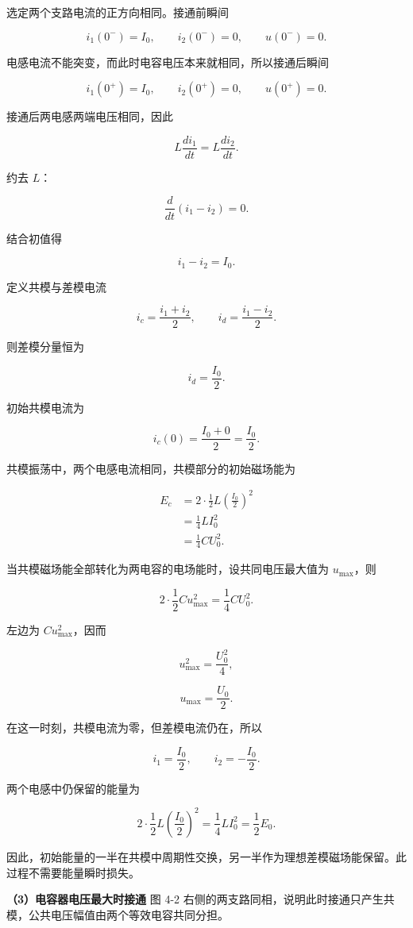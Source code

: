\documentclass[12pt,a4paper,UTF8]{ctexart}
\begin{document}
选定两个支路电流的正方向相同。接通前瞬间

\[i_1(0^-)=I_0,\qquad i_2(0^-)=0,\qquad u(0^-)=0.\]

电感电流不能突变，而此时电容电压本来就相同，所以接通后瞬间

\[i_1(0^+)=I_0,\qquad i_2(0^+)=0,\qquad u(0^+)=0.\]

接通后两电感两端电压相同，因此

\[L\frac{di_1}{dt}=L\frac{di_2}{dt}.\]

约去 \(L\)：

\[\frac d{dt}(i_1-i_2)=0.\]

结合初值得

\[\boxed{i_1-i_2=I_0}.\]

定义共模与差模电流

\[i_c=\frac{i_1+i_2}{2},\qquad
i_d=\frac{i_1-i_2}{2}.\]

则差模分量恒为

\[i_d=\frac{I_0}{2}.\]

初始共模电流为

\[i_c(0)=\frac{I_0+0}{2}=\frac{I_0}{2}.\]

共模振荡中，两个电感电流相同，共模部分的初始磁场能为

\[\begin{aligned}
E_c
&=2\cdot\frac12L\left(\frac{I_0}{2}\right)^2\\
&=\frac14LI_0^2\\
&=\frac14CU_0^2.
\end{aligned}\]

当共模磁场能全部转化为两电容的电场能时，设共同电压最大值为
\(u_{\max}\)，则

\[2\cdot\frac12C u_{\max}^2=\frac14CU_0^2.\]

左边为 \(Cu_{\max}^2\)，因而

\[u_{\max}^2=\frac{U_0^2}{4},\]

\[\boxed{u_{\max}=\frac{U_0}{2}}.\]

在这一时刻，共模电流为零，但差模电流仍在，所以

\[i_1=\frac{I_0}{2},\qquad i_2=-\frac{I_0}{2}.\]

两个电感中仍保留的能量为

\[2\cdot\frac12L\left(\frac{I_0}{2}\right)^2
=\frac14LI_0^2
=\frac12E_0.\]

因此，初始能量的一半在共模中周期性交换，另一半作为理想差模磁场能保留。此过程不需要能量瞬时损失。

\textbf{（3）电容器电压最大时接通} 图 4-2
右侧的两支路同相，说明此时接通只产生共模，公共电压幅值由两个等效电容共同分担。
\end{document}
